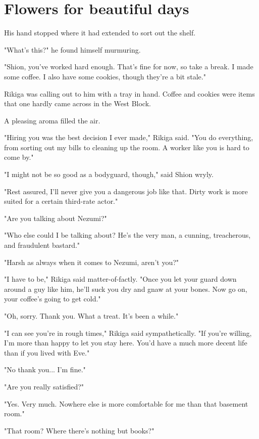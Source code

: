 
\chapter{Flowers for beautiful days}

His hand stopped where it had extended to sort out the shelf.

"What's this?" he found himself murmuring.

"Shion, you've worked hard enough. That's fine for now, so take a break. I made some coffee. I also have some cookies, though they're a bit stale."

Rikiga was calling out to him with a tray in hand. Coffee and cookies were items that one hardly came across in the West Block.

A pleasing aroma filled the air.

"Hiring you was the best decision I ever made," Rikiga said. "You do everything, from sorting out my bills to cleaning up the room. A worker like you is hard to come by."

"I might not be so good as a bodyguard, though," said Shion wryly.

"Rest assured, I'll never give you a dangerous job like that. Dirty work is more suited for a certain third-rate actor."

"Are you talking about Nezumi?"

"Who else could I be talking about? He's the very man, a cunning, treacherous, and fraudulent bastard."

"Harsh as always when it comes to Nezumi, aren't you?"

"I have to be," Rikiga said matter-of-factly. "Once you let your guard down around a guy like him, he'll suck you dry and gnaw at your bones. Now go on, your coffee's going to get cold."

"Oh, sorry. Thank you. What a treat. It's been a while."

"I can see you're in rough times," Rikiga said sympathetically. "If you're willing, I'm more than happy to let you stay here. You'd have a much more decent life than if you lived with Eve."

"No thank you... I'm fine."

"Are you really satisfied?"

"Yes. Very much. Nowhere else is more comfortable for me than that basement room."

"That room? Where there's nothing but books?"

